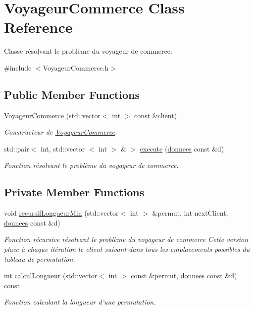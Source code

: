 \hypertarget{classVoyageurCommerce}{\section{\-Voyageur\-Commerce \-Class \-Reference}
\label{classVoyageurCommerce}
}


\-Classe résolvant le problème du voyageur de commerce.  




{\ttfamily \#include $<$\-Voyageur\-Commerce.\-h$>$}

\subsection*{\-Public \-Member \-Functions}
\begin{DoxyCompactItemize}
\item 
\hyperlink{classVoyageurCommerce_aa40ed299dffec21a34a0bbadf14141c6}{\-Voyageur\-Commerce} (std\-::vector$<$ int $>$ const \&client)
\begin{DoxyCompactList}\small\item\em \-Constructeur de \hyperlink{classVoyageurCommerce}{\-Voyageur\-Commerce}. \end{DoxyCompactList}\item 
std\-::pair$<$ int, std\-::vector\*
$<$ int $>$ \& $>$ \hyperlink{classVoyageurCommerce_af07653a7fff33dae41b62150b75508fb}{execute} (\hyperlink{structdonnees}{donnees} const \&d)
\begin{DoxyCompactList}\small\item\em \-Fonction résolvant le problème du voyageur de commerce. \end{DoxyCompactList}\end{DoxyCompactItemize}
\subsection*{\-Private \-Member \-Functions}
\begin{DoxyCompactItemize}
\item 
void \hyperlink{classVoyageurCommerce_a0ecd163ab1850e70da8ee97144f1f4f5}{recursif\-Longueur\-Min} (std\-::vector$<$ int $>$ \&permut, int next\-Client, \hyperlink{structdonnees}{donnees} const \&d)
\begin{DoxyCompactList}\small\item\em \-Fonction récursive résolvant le problème du voyageur de commerce \-Cette version place à chaque itération le client suivant dans tous les emplacements possibles du tableau de permutation. \end{DoxyCompactList}\item 
int \hyperlink{classVoyageurCommerce_a6309e52db23855bec21e8a54456c3c6d}{calcul\-Longueur} (std\-::vector$<$ int $>$ const \&permut, \hyperlink{structdonnees}{donnees} const \&d) const 
\begin{DoxyCompactList}\small\item\em \-Fonction calculant la longueur d'une permutation. \end{DoxyCompactList}\end{DoxyCompactItemize}
